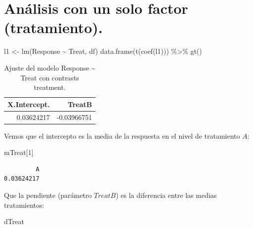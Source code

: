 \documentclass[
  12pt,
  a4paper,
  extrafontsizes,
  onecolumn,
  openright]{memoir}
\newenvironment{Shaded}{\begin{snugshade}}{\end{snugshade}}
\newcommand{\DecValTok}[1]{\textcolor[rgb]{0.68,0.00,0.00}{#1}}
\newcommand{\FunctionTok}[1]{\textcolor[rgb]{0.28,0.35,0.67}{#1}}
\newcommand{\NormalTok}[1]{\textcolor[rgb]{0.00,0.23,0.31}{#1}}
\newcommand{\OtherTok}[1]{\textcolor[rgb]{0.00,0.23,0.31}{#1}}
\newcommand{\SpecialCharTok}[1]{\textcolor[rgb]{0.37,0.37,0.37}{#1}}
\begin{document}
\normalsize

\hypertarget{anuxe1lisis-con-un-solo-factor-tratamiento.}{%
\section{Análisis con un solo factor
(tratamiento).}\label{anuxe1lisis-con-un-solo-factor-tratamiento.}}

\scriptsize

\begin{Shaded}
\begin{Highlighting}[]
\NormalTok{l1 }\OtherTok{\textless{}{-}} \FunctionTok{lm}\NormalTok{(Response }\SpecialCharTok{\textasciitilde{}}\NormalTok{ Treat, df)}
\FunctionTok{data.frame}\NormalTok{(}\FunctionTok{t}\NormalTok{(}\FunctionTok{coef}\NormalTok{(l1))) }\SpecialCharTok{\%\textgreater{}\%} \FunctionTok{gt}\NormalTok{()}
\end{Highlighting}
\end{Shaded}

\hypertarget{tbl-l1}{}
\begin{longtable}{rr}
\caption{\label{tbl-l1}Ajuste del modelo Response \textasciitilde{} Treat con contrasts
treatment. }\tabularnewline

\toprule
X.Intercept. & TreatB \\ 
\midrule
0.03624217 & -0.03966751 \\ 
\bottomrule
\end{longtable}

\normalsize

Vemos que el intercepto es la media de la respuesta en el nivel de
tratamiento \(A\):

\scriptsize

\begin{Shaded}
\begin{Highlighting}[]
\NormalTok{mTreat[}\DecValTok{1}\NormalTok{]}
\end{Highlighting}
\end{Shaded}

\begin{verbatim}
         A 
0.03624217 
\end{verbatim}

\normalsize

Que la pendiente (parámetro \(TreatB\)) es la diferencia entre las
medias tratamientos:

\scriptsize

\begin{Shaded}
\begin{Highlighting}[]
\NormalTok{dTreat}
\end{Highlighting}
\end{Shaded}
\end{document}
